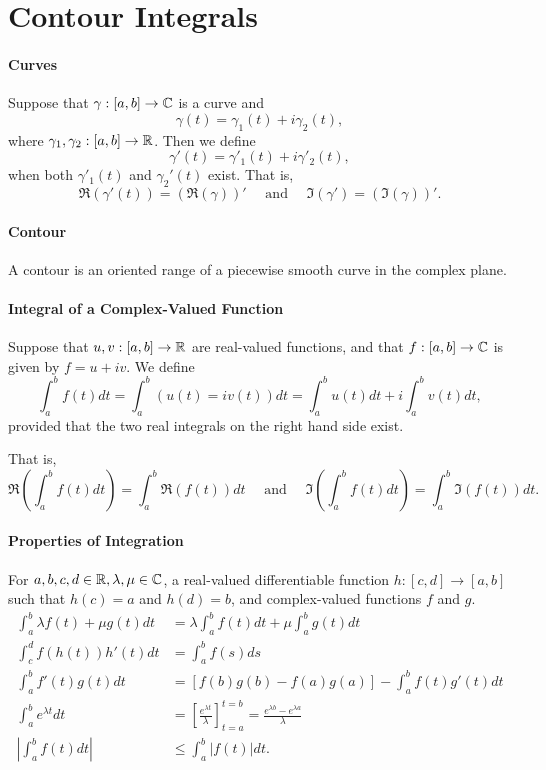 \section{Contour Integrals}

\paragraph{Curves}
Suppose that \(\gamma: [a, b] \to \mathbb{C}\) is a curve and
\[\gamma(t) = \gamma_1(t) + i\gamma_2(t),\]
where \(\gamma_1, \gamma_2: [a, b] \to \mathbb{R}\). Then we define
\[\gamma'(t) = \gamma'_1(t) + i\gamma'_2(t),\]
when both \(\gamma'_1(t)\) and \(\gamma_2'(t)\) exist.
That is,
\[\Re(\gamma'(t)) = (\Re(\gamma))' \quad \text{ and } \quad \Im(\gamma') = (\Im(\gamma))'.\]

\paragraph{Contour}
A contour is an oriented range of a piecewise smooth curve in the complex plane.

\paragraph{Integral of a Complex-Valued Function}
Suppose that \(u, v: [a, b] \to \mathbb{R}\) are real-valued functions, and that \(f: [a, b] \to \mathbb{C}\) is given by \(f = u + iv\). We define
\[\int_a^b f(t) dt = \int_a^b (u(t) = iv(t)) dt = \int_a^b u(t) dt + i \int_a^b v(t) dt,\]
provided that the two real integrals on the right hand side exist.

That is,
\[\Re\left( \int_a^b f(t) dt\right) = \int_a^b \Re(f(t)) dt \quad \text{ and } \quad \Im\left(\int_a^b f(t) dt\right) = \int_a^b \Im(f(t)) dt.\]

\paragraph{Properties of Integration}
For \(a,b,c,d \in \mathbb{R}, \lambda, \mu \in \mathbb{C}\), a real-valued differentiable function \(h: [c, d] \to [a, b]\) such that \(h(c) = a\) and \(h(d) = b\), and complex-valued functions \(f\) and \(g\).
\begin{align*}
    \int_a^b \lambda f(t) + \mu g(t) dt & = \lambda \int_a^b f(t) dt + \mu \int_a^b g(t) dt \\
    \int_c^d f(h(t))h'(t) dt & = \int_a^b f(s) ds \\
    \int_a^b f'(t) g(t) dt & = [f(b)g(b) - f(a)g(a)] - \int_a^b f(t)g'(t) dt \\
    \int_a^b e^{\lambda t} dt & = \left[\frac{e^{\lambda t}}{\lambda}\right]_{t=a}^{t=b} = \frac{e^{\lambda b} - e^{\lambda a}}{\lambda} \\
    |\int_a^b f(t) dt | & \leq \int_a^b |f(t)| dt.
\end{align*}

